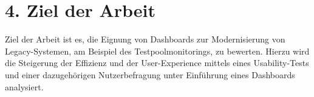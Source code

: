 \section*{4. Ziel der Arbeit}
Ziel der Arbeit ist es, die Eignung von Dashboards zur Modernisierung von Legacy-Systemen, am Beispiel des Testpoolmonitorings, zu bewerten. Hierzu wird die Steigerung der Effizienz und der User-Experience mittels eines Usability-Tests und einer dazugehörigen Nutzerbefragung unter Einführung eines Dashboards analysiert. 

